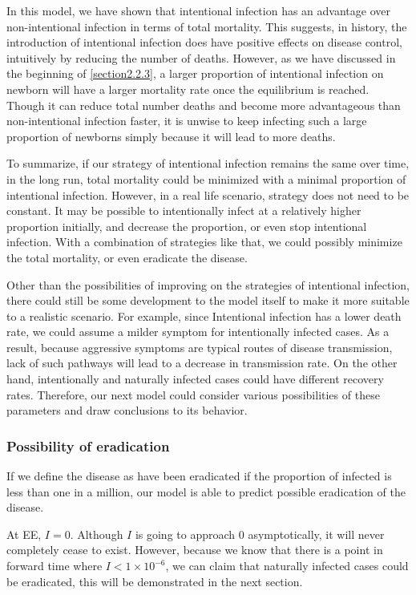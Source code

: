 \documentclass[12pt]{article}
\begin{document}
In this model, we have shown that intentional infection has an advantage over non-intentional infection in terms of total mortality. This suggests, in history, the introduction of intentional infection does have positive effects on disease control, intuitively by reducing the number of deaths. However, as we have discussed in the beginning of \autoref{section2.2.3}, a larger proportion of intentional infection on newborn will have a larger mortality rate once the equilibrium is reached. Though it can reduce total number deaths and become more advantageous than non-intentional infection faster, it is unwise to keep infecting such a large proportion of newborns simply because it will lead to more deaths. 

To summarize, if our strategy of intentional infection remains the same over time, in the long run, total mortality could be minimized with a minimal proportion of intentional infection. However, in a real life scenario, strategy does not need to be constant. It may be possible to intentionally infect at a relatively higher proportion initially, and decrease the proportion, or even stop intentional infection. With a combination of strategies like that, we could possibly minimize the total mortality, or even eradicate the disease.

Other than the possibilities of improving on the strategies of intentional infection, there could still be some development to the model itself to make it more suitable to a realistic scenario. For example, since Intentional infection has a lower death rate, we could assume a milder symptom for intentionally infected cases. As a result, because aggressive symptoms are typical routes of disease transmission, lack of such pathways will lead to a decrease in transmission rate. On the other hand, intentionally and naturally infected cases could have different recovery rates. Therefore, our next model could consider various possibilities of these parameters and draw conclusions to its behavior.

\subsubsection{Possibility of eradication}
If we define the disease as have been eradicated if the proportion of infected is less than one in a million, our model is able to predict possible eradication of the disease.

At EE, $I=0$. Although $I$ is going to approach 0 asymptotically, it will never completely cease to exist. However, because we know that there is a point in forward time where $I<1\times10^{-6}$, we can claim that naturally infected cases could be eradicated, this will be demonstrated in the next section.
\end{document}
